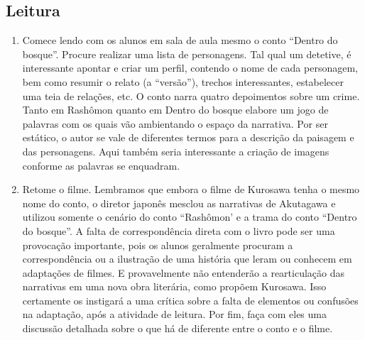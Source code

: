\documentclass[12pt]{extarticle}
\begin{document}
 


\subsection{Leitura}



\begin{enumerate} 

\item Comece lendo com os alunos em sala de aula mesmo o
conto ``Dentro do bosque''.  Procure realizar uma lista de personagens.
Tal qual um detetive, é interessante apontar e criar um perfil, contendo
o nome de cada personagem, bem como resumir o relato (a ``versão''),
trechos interessantes, estabelecer uma teia de relações, etc.  O conto
narra quatro depoimentos sobre um crime. Tanto em Rashômon quanto em
Dentro do bosque elabore um jogo de palavras com os quais vão ambientando
o espaço da narrativa. Por ser estático, o autor se vale de diferentes
termos para a descrição da paisagem e das personagens.  Aqui também seria
interessante a criação de imagens conforme as palavras se enquadram.



\item Retome o filme. Lembramos que embora o filme de Kurosawa tenha o mesmo
nome do conto, o diretor japonês mesclou as narrativas de Akutagawa e
utilizou somente o cenário do conto ``Rashômon' e a trama do conto ``Dentro
do bosque''. A falta de correspondência direta com o livro pode ser uma
provocação importante, pois os alunos geralmente procuram a correspondência
ou a ilustração de uma história que leram ou conhecem em adaptações de
filmes. E provavelmente não entenderão a rearticulação das narrativas em
uma nova obra literária, como propõem Kurosawa. Isso certamente os
instigará a uma crítica sobre a falta de elementos ou confusões na
adaptação, após a atividade de leitura. Por fim, faça com eles uma
discussão detalhada sobre o que há de diferente entre o conto e o filme. 


\end{enumerate}
 
\end{document}
